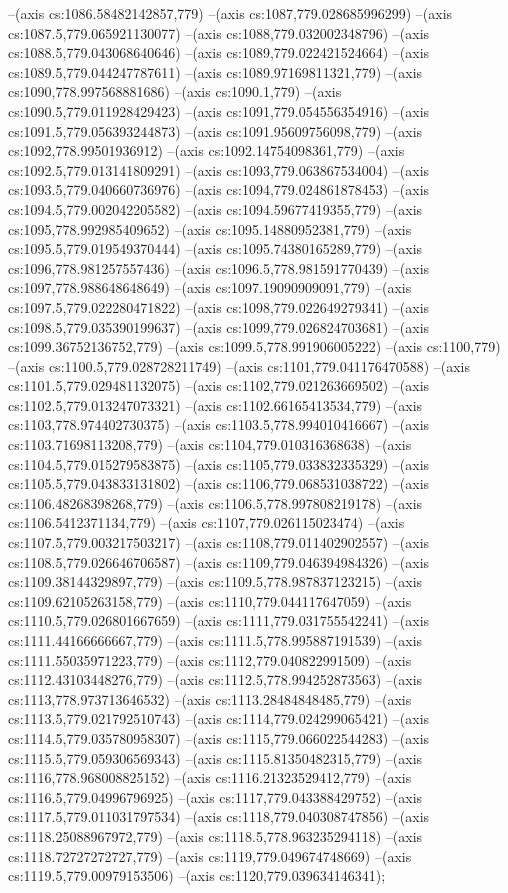 --(axis cs:1086.58482142857,779)
--(axis cs:1087,779.028685996299)
--(axis cs:1087.5,779.065921130077)
--(axis cs:1088,779.032002348796)
--(axis cs:1088.5,779.043068640646)
--(axis cs:1089,779.022421524664)
--(axis cs:1089.5,779.044247787611)
--(axis cs:1089.97169811321,779)
--(axis cs:1090,778.997568881686)
--(axis cs:1090.1,779)
--(axis cs:1090.5,779.011928429423)
--(axis cs:1091,779.054556354916)
--(axis cs:1091.5,779.056393244873)
--(axis cs:1091.95609756098,779)
--(axis cs:1092,778.99501936912)
--(axis cs:1092.14754098361,779)
--(axis cs:1092.5,779.013141809291)
--(axis cs:1093,779.063867534004)
--(axis cs:1093.5,779.040660736976)
--(axis cs:1094,779.024861878453)
--(axis cs:1094.5,779.002042205582)
--(axis cs:1094.59677419355,779)
--(axis cs:1095,778.992985409652)
--(axis cs:1095.14880952381,779)
--(axis cs:1095.5,779.019549370444)
--(axis cs:1095.74380165289,779)
--(axis cs:1096,778.981257557436)
--(axis cs:1096.5,778.981591770439)
--(axis cs:1097,778.988648648649)
--(axis cs:1097.19090909091,779)
--(axis cs:1097.5,779.022280471822)
--(axis cs:1098,779.022649279341)
--(axis cs:1098.5,779.035390199637)
--(axis cs:1099,779.026824703681)
--(axis cs:1099.36752136752,779)
--(axis cs:1099.5,778.991906005222)
--(axis cs:1100,779)
--(axis cs:1100.5,779.028728211749)
--(axis cs:1101,779.041176470588)
--(axis cs:1101.5,779.029481132075)
--(axis cs:1102,779.021263669502)
--(axis cs:1102.5,779.013247073321)
--(axis cs:1102.66165413534,779)
--(axis cs:1103,778.974402730375)
--(axis cs:1103.5,778.994010416667)
--(axis cs:1103.71698113208,779)
--(axis cs:1104,779.010316368638)
--(axis cs:1104.5,779.015279583875)
--(axis cs:1105,779.033832335329)
--(axis cs:1105.5,779.043833131802)
--(axis cs:1106,779.068531038722)
--(axis cs:1106.48268398268,779)
--(axis cs:1106.5,778.997808219178)
--(axis cs:1106.5412371134,779)
--(axis cs:1107,779.026115023474)
--(axis cs:1107.5,779.003217503217)
--(axis cs:1108,779.011402902557)
--(axis cs:1108.5,779.026646706587)
--(axis cs:1109,779.046394984326)
--(axis cs:1109.38144329897,779)
--(axis cs:1109.5,778.987837123215)
--(axis cs:1109.62105263158,779)
--(axis cs:1110,779.044117647059)
--(axis cs:1110.5,779.026801667659)
--(axis cs:1111,779.031755542241)
--(axis cs:1111.44166666667,779)
--(axis cs:1111.5,778.995887191539)
--(axis cs:1111.55035971223,779)
--(axis cs:1112,779.040822991509)
--(axis cs:1112.43103448276,779)
--(axis cs:1112.5,778.994252873563)
--(axis cs:1113,778.973713646532)
--(axis cs:1113.28484848485,779)
--(axis cs:1113.5,779.021792510743)
--(axis cs:1114,779.024299065421)
--(axis cs:1114.5,779.035780958307)
--(axis cs:1115,779.066022544283)
--(axis cs:1115.5,779.059306569343)
--(axis cs:1115.81350482315,779)
--(axis cs:1116,778.968008825152)
--(axis cs:1116.21323529412,779)
--(axis cs:1116.5,779.04996796925)
--(axis cs:1117,779.043388429752)
--(axis cs:1117.5,779.011031797534)
--(axis cs:1118,779.040308747856)
--(axis cs:1118.25088967972,779)
--(axis cs:1118.5,778.963235294118)
--(axis cs:1118.72727272727,779)
--(axis cs:1119,779.049674748669)
--(axis cs:1119.5,779.00979153506)
--(axis cs:1120,779.039634146341);

